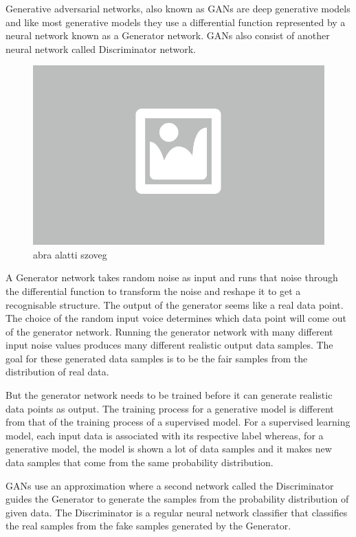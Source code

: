 Generative adversarial networks, also known as GANs are deep generative models and like most generative models they use a differential function represented by a neural network known as a Generator network. GANs also consist of another neural network called Discriminator network.

\begin{figure}[ht]
	\centering
	\includegraphics[width=0.65\columnwidth]{figures/abra.png}
	\caption{abra alatti szoveg}
\end{figure}

A Generator network takes random noise as input and runs that noise through the differential function to transform the noise and reshape it to get a recognisable structure. The output of the generator seems like a real data point. The choice of the random input voice determines which data point will come out of the generator network. Running the generator network with many different input noise values produces many different realistic output data samples. The goal for these generated data samples is to be the fair samples from the distribution of real data.

But the generator network needs to be trained before it can generate realistic data points as output. The training process for a generative model is different from that of the training process of a supervised model. For a supervised learning model, each input data is associated with its respective label whereas, for a generative model, the model is shown a lot of data samples and it makes new data samples that come from the same probability distribution.

GANs use an approximation where a second network called the Discriminator guides the Generator to  generate the samples from the probability distribution of given data. The Discriminator is a regular neural network classifier that classifies the real samples from the fake samples generated by the Generator.

